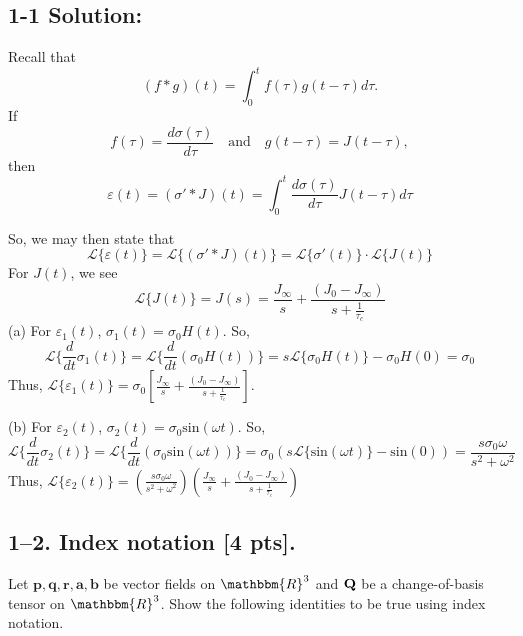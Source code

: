 \subsection*{\textbf{1-1 Solution:}}
Recall that
\begin{equation*}(f*g)(t)=\int_0^tf(\tau)g(t-\tau)d\tau.\end{equation*}
If
\begin{equation*}
    f(\tau)=\frac{d\sigma(\tau)}{d\tau}\quad\text{and}\quad g(t-\tau)=J(t-\tau),
\end{equation*}
then
\begin{equation*}\varepsilon(t)=(\sigma'*J)(t)=\int_0^t \frac{d\sigma(\tau)}{d\tau}J(t-\tau) d\tau\end{equation*}

So, we may then state that
\begin{equation*}
    \mathcal{L}\{\varepsilon(t)\}=\mathcal{L}\{(\sigma'*J)(t)\}=\mathcal{L}\{{\sigma'(t)}\}\cdot\mathcal{L}\{J(t)\}
\end{equation*}
For $J(t)$, we see
\begin{equation*}
    \mathcal{L}\{J(t)\}=J(s)=\frac{J_{\infty}}{s}+\frac{(J_0-J_{\infty})}{s+\frac{1}{\tau_c}}
\end{equation*}
(a) For $\varepsilon_1(t)$, $\sigma_1(t)=\sigma_0H(t)$. So,
\begin{equation*}
    \mathcal{L}\{\frac{d}{dt}\sigma_1(t)\}=\mathcal{L}\{\frac{d}{dt}(\sigma_0H(t))\}=s\mathcal{L}\{\sigma_0H(t)\}-\sigma_0H(0)=\sigma_0
\end{equation*}
Thus, $\mathcal{L}\{\varepsilon_1(t)\}=\sigma_0[\frac{J_{\infty}}{s}+\frac{(J_0-J_{\infty})}{s+\frac{1}{\tau_c}}]$.

\medskip
(b) For $\varepsilon_2(t)$, $\sigma_2(t)=\sigma_0\text{sin}(\omega t)$. So,
\begin{equation*}
    \mathcal{L}\{\frac{d}{dt}\sigma_2(t)\}=\mathcal{L}\{\frac{d}{dt}(\sigma_0\text{sin}(\omega t))\}=\sigma_0(s\mathcal{L}\{\text{sin}(\omega t)\}-\text{sin}(0))=\frac{s\sigma_0\omega}{s^2+\omega^2}
\end{equation*}
Thus, $\mathcal{L}\{\varepsilon_2(t)\}=(\frac{s\sigma_0\omega}{s^2+\omega^2})(\frac{J_{\infty}}{s}+\frac{(J_0-J_{\infty})}{s+\frac{1}{\tau_c}})$
\bigskip
\subsection*{1--2. \textbf{Index notation} [4 pts].} Let $\bm{p}, \bm{q}, \bm{r}, \bm{a}, \bm{b}$ be vector fields on $\mathbbm{R}^3$ and $\mathbf{Q}$ be a change-of-basis tensor on $\mathbbm{R}^3$. Show the following identities to be true using index notation. 

